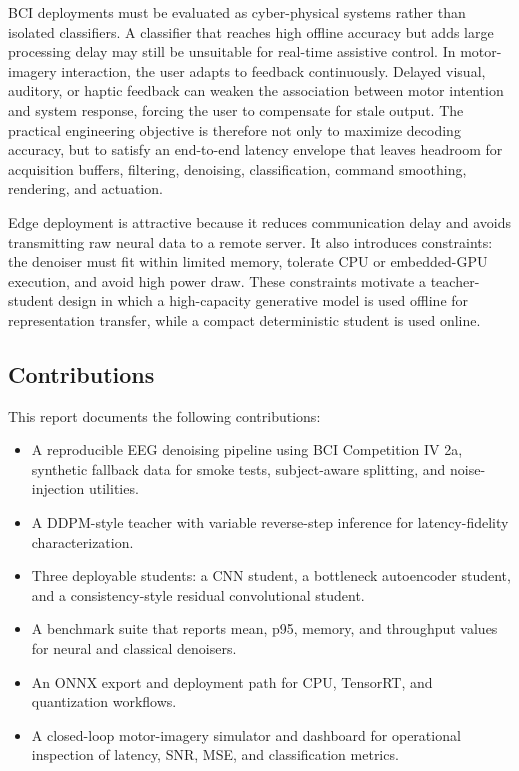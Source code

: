 \documentclass[11pt]{article}
\begin{document}
BCI deployments must be evaluated as cyber-physical systems rather than isolated classifiers. A classifier that reaches high offline accuracy but adds large processing delay may still be unsuitable for real-time assistive control. In motor-imagery interaction, the user adapts to feedback continuously. Delayed visual, auditory, or haptic feedback can weaken the association between motor intention and system response, forcing the user to compensate for stale output. The practical engineering objective is therefore not only to maximize decoding accuracy, but to satisfy an end-to-end latency envelope that leaves headroom for acquisition buffers, filtering, denoising, classification, command smoothing, rendering, and actuation.

Edge deployment is attractive because it reduces communication delay and avoids transmitting raw neural data to a remote server. It also introduces constraints: the denoiser must fit within limited memory, tolerate CPU or embedded-GPU execution, and avoid high power draw. These constraints motivate a teacher-student design in which a high-capacity generative model is used offline for representation transfer, while a compact deterministic student is used online.

\subsection{Contributions}

This report documents the following contributions:

\begin{itemize}
    \item A reproducible EEG denoising pipeline using BCI Competition IV 2a, synthetic fallback data for smoke tests, subject-aware splitting, and noise-injection utilities.
    \item A DDPM-style teacher with variable reverse-step inference for latency-fidelity characterization.
    \item Three deployable students: a CNN student, a bottleneck autoencoder student, and a consistency-style residual convolutional student.
    \item A benchmark suite that reports mean, p95, memory, and throughput values for neural and classical denoisers.
    \item An ONNX export and deployment path for CPU, TensorRT, and quantization workflows.
    \item A closed-loop motor-imagery simulator and dashboard for operational inspection of latency, SNR, MSE, and classification metrics.
\end{itemize}
\end{document}
